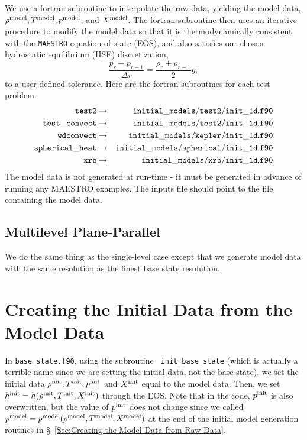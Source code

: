 We use a fortran subroutine
to interpolate the raw data, yielding the model data, $\rho^{\rm model},
T^{\rm model}, p^{\rm model}$, and $X^{\rm model}$.  The fortran subroutine
then uses an iterative procedure to modify the model data so that it
is thermodynamically consistent with the {\tt MAESTRO} equation of
state (EOS), and also satisfies our chosen hydrostatic equilibrium
(HSE) discretization,
\begin{equation}
\frac{p_r - p_{r-1}}{\Delta r} = \frac{\rho_r + \rho_{r-1}}{2}g,\label{HSE Discretization}
\end{equation}
to a user defined tolerance.  Here are the fortran subroutines for each test problem:
\begin{eqnarray}
{\tt test2} & \rightarrow & {\tt initial\_models/test2/init\_1d.f90} \nonumber \\
{\tt test\_convect} & \rightarrow & {\tt initial\_models/test2/init\_1d.f90} \nonumber \\
{\tt wdconvect} & \rightarrow & {\tt initial\_models/kepler/init\_1d.f90} \nonumber \\
{\tt spherical\_heat} & \rightarrow & {\tt initial\_models/spherical/init\_1d.f90} \nonumber \\
{\tt xrb} & \rightarrow & {\tt initial\_models/xrb/init\_1d.f90} \nonumber
\end{eqnarray}
The model data is not generated at run-time - it must be generated in
advance of running any MAESTRO examples.  The inputs file should point
to the file containing the model data.

\subsection{Multilevel Plane-Parallel}
We do the same thing as the single-level case except that we generate
model data with the same resolution as the finest base state
resolution.


\section{Creating the Initial Data from the Model Data}
In {\tt base\_state.f90}, using the subroutine {\tt
  init\_base\_state} (which is actually a terrible name since we
are setting the initial data, not the base state), we set the initial
data $\rho^{\rm init}, T^{\rm init}, p^{\rm init}$ and $X^{\rm init}$ equal to the
model data.  Then, we set $h^{\rm init} =
h(\rho^{\rm init},T^{\rm init},X^{\rm init})$ through the EOS.  Note that in the code,
$p^{\rm init}$ is also overwritten, but the value of $p^{\rm init}$ does not
change since we called $p^{\rm model} =
p^{\rm model}(\rho^{\rm model},T^{\rm model},X^{\rm model})$ at the end of the
initial model generation routines in \S~\ref{Sec:Creating the Model Data from Raw
  Data}.

